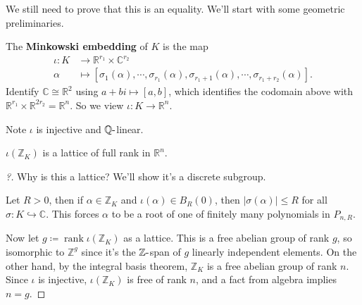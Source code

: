 \begin{remark}

We still need to prove that this is an equality. We'll start with some
geometric preliminaries.

\end{remark}

\begin{definition}

The \textbf{Minkowski embedding} of \(K\) is the map
\begin{align*}
\iota: K &\to {\mathbb{R}}^{r_1} \times {\mathbb{C}}^{r_2} \\
\alpha &\mapsto {\left[ { 
\sigma_1(\alpha), \cdots, \sigma_{r_1}( \alpha),
\sigma_{r_1 + 1}( \alpha), \cdots, \sigma_{r_1 + r_2}( \alpha)
} \right]}
.\end{align*}
Identify \({\mathbb{C}}\cong {\mathbb{R}}^2\) using
\(a+bi \mapsto {\left[ {a, b} \right]}\), which identifies the codomain
above with
\({\mathbb{R}}^{r_1} \times {\mathbb{R}}^{2r_2} = {\mathbb{R}}^n\). So
we view \(\iota:K\to {\mathbb{R}}^n\).

\end{definition}

\begin{remark}

Note \(\iota\) is injective and \({\mathbb{Q}}{\hbox{-}}\)linear.

\end{remark}

\begin{proposition}

\(\iota({\mathbb{Z}}_K)\) is a lattice of full rank in
\({\mathbb{R}}^n\).

\end{proposition}

\begin{proof}[?]

Why is this a lattice? We'll show it's a discrete subgroup.

Let \(R>0\), then if \(\alpha\in {\mathbb{Z}}_K\) and
\(\iota(\alpha) \in B_R(0)\), then
\({\left\lvert {\sigma( \alpha)} \right\rvert} \leq R\) for all
\(\sigma: K\hookrightarrow{\mathbb{C}}\). This forces \(\alpha\) to be a
root of one of finitely many polynomials in \(P_{n, R}\).

Now let \(g\coloneqq\operatorname{rank}\iota({\mathbb{Z}}_K)\) as a
lattice. This is a free abelian group of rank \(g\), so isomorphic to
\({\mathbb{Z}}^g\) since it's the \({\mathbb{Z}}{\hbox{-}}\)span of
\(g\) linearly independent elements. On the other hand, by the integral
basis theorem, \({\mathbb{Z}}_K\) is a free abelian group of rank \(n\).
Since \(\iota\) is injective, \(\iota({\mathbb{Z}}_K)\) is free of rank
\(n\), and a fact from algebra implies \(n=g\).

\end{proof}


